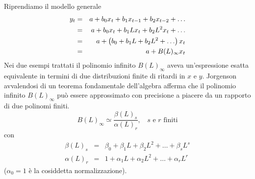 \documentclass[a4paper]{report}
\newcounter{ese}
\theoremstyle{remark}
\begin{document}
Riprendiamo il modello generale 
\begin{eqnarray}
y_{t} &=&a+b_{0}x_{t}+b_{1}x_{t-1}+b_{2}x_{t-2}+\ldots
\label{equazione di partenza} \\
&=&a+b_{0}x_{t}+b_{1}Lx_{t}+b_{2}L^{2}x_{t}+\ldots  \notag \\
&=&a+\left( b_{0}+b_{1}L+b_{2}L^{2}+\ldots \right) x_{t}  \notag \\
&=&a+B(L)_{\infty }x_{t}  \notag
\end{eqnarray}%
Nei due esempi trattati il polinomio infinito $B(L)_{\infty }$ aveva
un'espressione esatta equivalente in termini di due distribuzioni finite di
ritardi in $x$ e $y$. Jorgenson avvalendosi di un teorema fondamentale
dell'algebra afferma che il polinomio infinito $B(L)_{\infty }$ pu\`{o}
essere approssimato con precisione a piacere da un rapporto di due polinomi
finiti.%
\begin{equation*}
B(L)_{\infty }\simeq \frac{\beta (L)_{s}}{\alpha (L)_{r}},\ \ \ \ s\text{ e }%
r\text{ finiti}
\end{equation*}%
con%
\begin{eqnarray*}
\beta (L)_{s} &=&\beta _{0}+\beta _{1}L+\beta _{2}L^{2}+\ldots +\beta
_{s}L^{s} \\
\alpha (L)_{r} &=&1+\alpha _{1}L+\alpha _{2}L^{2}+\ldots +\alpha _{r}L^{r}
\end{eqnarray*}%
($\alpha _{0}=1$ \`{e} la cosiddetta normalizzazione).
\end{document}
